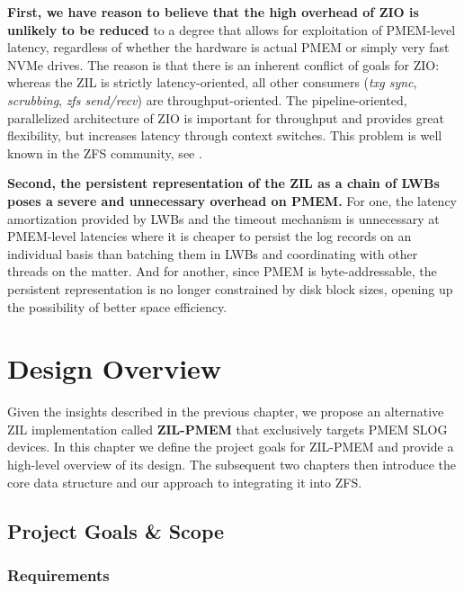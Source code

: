 \documentclass[12pt,a4paper,twoside]{book}
\begin{document}
\textbf{First, we have reason to believe that the high overhead of ZIO is unlikely to be reduced} to a degree that allows for exploitation of PMEM-level latency, regardless of whether the hardware is actual PMEM or simply very fast NVMe drives.
The reason is that there is an inherent conflict of goals for ZIO:
whereas the ZIL is strictly latency-oriented, all other consumers (\textit{txg sync}, \textit{scrubbing}, \textit{zfs send/recv}) are throughput-oriented.
The pipeline-oriented, parallelized architecture of ZIO is important for throughput and provides great flexibility, but increases latency through context switches.
This problem is well known in the ZFS community, see \cite{openzfsZILPerformanceImprovements2020,ZFSSubredditRichardYaoCommentsOnPoorSynchronousWritePerformance,OpenZFSGithubIssueNVMeReadPerformanceZioPipeliningOverheadTimChaseComment}.

\textbf{Second, the persistent representation of the ZIL as a chain of LWBs poses a severe and unnecessary overhead on PMEM.}
For one, the latency amortization provided by LWBs and the timeout mechanism is unnecessary at PMEM-level latencies where it is cheaper to persist the log records on an individual basis than batching them in LWBs and coordinating with other threads on the matter.
And for another, since PMEM is byte-addressable, the persistent representation is no longer constrained by disk block sizes, opening up the possibility of better space efficiency.

\chapter{Design Overview}\label{ch:designoverview}
Given the insights described in the previous chapter, we propose an alternative ZIL implementation called \textbf{ZIL-PMEM} that exclusively targets PMEM SLOG devices.
In this chapter we define the project goals for ZIL-PMEM and provide a high-level overview of its design.
The subsequent two chapters then introduce the core data structure and our approach to integrating it into ZFS.

\section{Project Goals \& Scope}

\newcommand{\csgoal}[1]{\textbf{#1}}

\subsection{Requirements}\label{sec:requirements}
\end{document}

